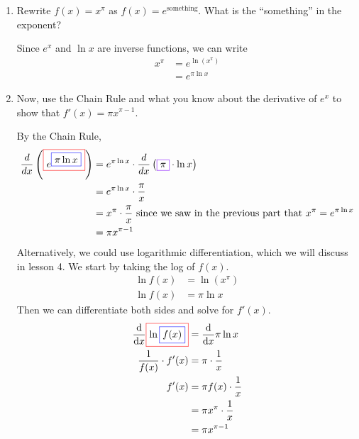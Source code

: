 \documentclass{article}
\begin{document}
\begin{enumerate}
  \begin{enumerate}
  \item
    \begin{problem}[\vfill]
      Rewrite $f(x) = x^{\pi}$ as $f(x) = e^{\text{something}}$.  What
      is the ``something'' in the exponent?
    \end{problem}

    \begin{solution}
      Since $e^x$ and $\ln x$ are inverse functions, we can write
      \begin{align*}
        x^{\pi} &= e^{\ln (x^\pi)} \\
        &= e^{\pi \ln x}
      \end{align*}
    \end{solution}

  \item
    \begin{problem}[\vfill\newpage]
      Now, use the Chain Rule and what you know about the derivative of
      $e^x$ to show that $f'(x) = \pi x^{\pi - 1}$. 
    \end{problem}

    \begin{solution}
      By the Chain Rule,
      \begin{align*}
        \frac{d}{dx} \left(\fcolorbox{red}{white}{$\displaystyle e^ {
              \fcolorbox{blue}{white}{$\displaystyle \pi  \ln x$}} $}\right)
        = {} & e^ { \pi \ln x} \cdot \frac{d}{dx}
        \left(\fcolorbox{purple}{white}{$\displaystyle \pi$}\cdot \ln
          x\right) \\ 
        = {} & e^ { \pi \ln x} \cdot \frac{\pi}{x} \\
        = {} & x^\pi \cdot \frac{\pi}{x} \text{ since we saw in the previous
          part that $x^{\pi} = e^{\pi \ln x}$} \\
        = {} & \pi x^{\pi - 1}
      \end{align*}
      Alternatively, we could use logarithmic differentiation, which we
      will discuss in lesson 4. We start by taking the log of $f(x)$.
      \begin{align*}
        \ln f(x) &= \ln(x^\pi) \\
        \ln f(x) &= \pi \ln x 
      \end{align*}
      Then we can differentiate both sides and solve for $f'(x)$.
      \begin{align*}
        \diff*{\fcolorbox{red}{white}{$\ln \fcolorbox{blue}{white}
        {$f(x)$}$}}{x} &= \diff*{\pi\ln x}{x} \\
        \frac{1}{f(x)} \cdot f'(x) &= \pi \cdot \frac{1}{x} \\
        f'(x) &= \pi f(x) \cdot \frac{1}{x} \\
        &= \pi x^\pi \cdot \frac{1}{x} \\
        &= \pi x^{\pi-1}
      \end{align*}
    \end{solution}
  \end{enumerate}


\end{enumerate}
\end{document}
